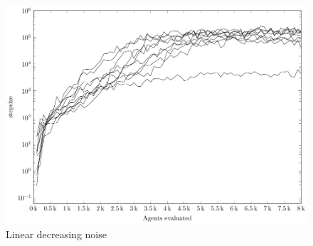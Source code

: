 \begin{figure}[H]
\begin{center}
\includegraphics[scale=0.48]{plots/linearNoisePlot}
\end{center}
\caption{Linear decreasing noise \label{fig:ceLinNoise}}
\end{figure}

